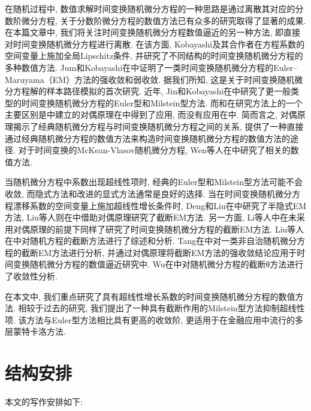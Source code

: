 在随机过程中, 数值求解时间变换随机微分方程的一种思路是通过离散其对应的分数阶微分方程, 关于分数阶微分方程的数值方法已有众多的研究取得了显著的成果. 在本篇文章中, 我们将关注时间变换随机微分方程数值逼近的另一种方法, 即直接对时间变换随机微分方程进行离散. 在该方面, Kobayashi及其合作者在方程系数的空间变量上施加全局Lipschitz条件, 并研究了不同结构的时间变换随机微分方程的多种数值方法. Jum和Kobayashi在\cite{Jum2016201}中证明了一类时间变换随机微分方程的Euler–Maruyama（EM）方法的强收敛和弱收敛. 据我们所知, 这是关于时间变换随机微分方程解的样本路径模拟的首次研究. 近年, Jin和Kobayashi在中研究了更一般类型的时间变换随机微分方程的Euler型和Milstein型方法. 而\cite{Jum2016201}和在研究方法上的一个主要区别是\cite{Kobayashi2011}中建立的对偶原理在\cite{Jum2016201}中得到了应用, 而没有应用在中. 简而言之, 对偶原理揭示了经典随机微分方程与时间变换随机微分方程之间的关系, 提供了一种直接通过经典随机微分方程的数值方法来构造时间变换随机微分方程的数值方法的途径. 对于时间变换的McKean-Vlasov随机微分方程, Wen等人在\cite{Wen2023}中研究了相关的数值方法.

当随机微分方程中系数出现超线性项时, 经典的Euler型和Milstein型方法可能不会收敛\cite{Hutzenthaler20111563}, 而隐式方法和改进的显式方法通常是良好的选择. 当在时间变换随机微分方程漂移系数的空间变量上施加超线性增长条件时, Deng和Liu在\cite{Deng20201133}中研究了半隐式EM方法, Liu等人则在\cite{Liu202066}中借助对偶原理研究了截断EM方法. 另一方面, Li等人\cite{Li2023651}中在未采用对偶原理的前提下同样了研究了时间变换随机微分方程的截断EM方法. Liu等人在\cite{刘暐2020}中对随机方程的截断方法进行了综述和分析. Tang在\cite{汤婧雯2021}中对一类非自治随机微分方程的截断EM方法进行分析, 并通过对偶原理将截断EM方法的强收敛结论应用于时间变换随机微分方程的数值逼近研究中. Wu在\cite{吴硕2017}中对随机微分方程的截断θ方法进行了收敛性分析.

在本文中, 我们重点研究了具有超线性增长系数的时间变换随机微分方程的数值方法. 相较于过去的研究, 我们提出了一种具有截断作用的Milstein型方法抑制超线性项. 该方法与Euler型方法相比具有更高的收敛阶, 更适用于在金融应用中流行的多层蒙特卡洛方法.

\section{结构安排}

本文的写作安排如下:

